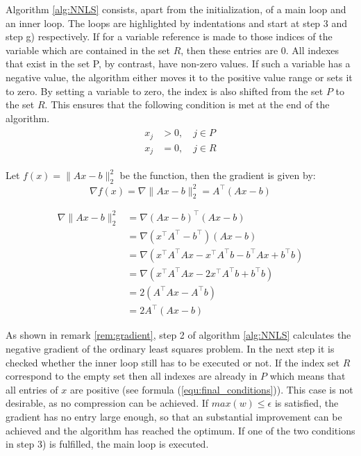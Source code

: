 Algorithm \ref{alg:NNLS} consists, apart from the initialization, of a main loop and an inner loop. The loops are highlighted by indentations and start at step 3 and step g) respectively. If for a variable reference is made to those indices of the variable which are contained in the set $R$, then these entries are 0. All indexes that exist in the set P, by contrast, have non-zero values. If such a variable has a negative value, the algorithm either moves it to the positive value range or sets it to zero. By setting a variable to zero, the index is also shifted from the set $P$ to the set $R$. This ensures that the following condition is met at the end of the algorithm.   
\begin{align}\label{equ:final_conditions}
\begin{split}
	x_j &> 0, \quad j \in P \\
	x_j &= 0, \quad j \in R
\end{split}
\end{align}



\begin{remark}\label{rem:gradient}
	Let $f(x) = \lVert Ax -b \rVert_2^2$ be the function, then the gradient is given by: 
	\begin{equation*}
		\nabla f(x) = \nabla \lVert Ax -b \rVert_2^2 = A^\top(Ax-b)
	\end{equation*}
	
	\begin{align*}
		\nabla \lVert Ax -b \rVert_2^2	&= \nabla (Ax-b)^\top (Ax-b) \\
										&= \nabla (x^\top A^\top - b^\top)(Ax-b) \\
										&= \nabla (x^\top A^\top Ax - x^\top A^\top b - b^\top Ax + b^\top b) \\
										&= \nabla (x^\top A^\top Ax - 2x^\top A^\top b + b^\top b) \\
										&= 2 (A^\top A x - A^\top b) \\
										&= 2A^\top (Ax - b)
	\end{align*}
\end{remark}

As shown in remark \ref{rem:gradient}, step 2 of algorithm \ref{alg:NNLS} calculates the negative gradient of the ordinary least squares problem. In the next step it is checked whether the inner loop still has to be executed or not. If the index set $R$ correspond to the empty set then all indexes are already in $P$ which means that all entries of $x$ are positive (see formula (\ref{equ:final_conditions})). This case is not desirable, as no compression can be achieved. If $max(w) \leq \epsilon$ is satisfied, the gradient has no entry large enough, so that an substantial improvement can be achieved and the algorithm has reached the optimum. If one of the two conditions in step 3) is fulfilled, the main loop is executed. 

